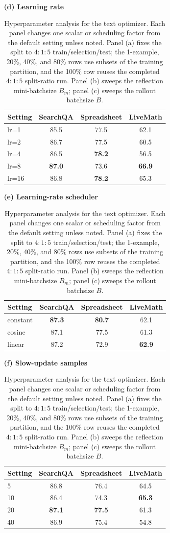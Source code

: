 \documentclass{llmxive}
\providecommand{\ablationbenchmarkheader}{\textbf{Setting} & \textbf{SearchQA} & \textbf{Spreadsheet} & \textbf{LiveMath} \\}
\begin{document}
\begin{table}[t]
{\begin{minipage}{1.12\textwidth}
\vspace{2pt}

\begin{minipage}[c]{0.33\textwidth}
\centering
\textbf{(d) Learning rate}\\[-1pt]
\begin{tabular}{@{}lccc@{}}
\toprule
\ablationbenchmarkheader
\midrule
lr=1 & 85.5 & 77.5 & 62.1 \\
lr=2 & 86.7 & 77.5 & 60.5 \\
lr=4 & 86.5 & \textbf{78.2} & 56.5 \\
lr=8 & \textbf{87.0} & 73.6 & \textbf{66.9} \\
lr=16 & 86.8 & \textbf{78.2} & 65.3 \\
\bottomrule
\end{tabular}
\end{minipage}
\hfill
\begin{minipage}[c]{0.33\textwidth}
\centering
\textbf{(e) Learning-rate scheduler}\\[-1pt]
\begin{tabular}{@{}lccc@{}}
\toprule
\ablationbenchmarkheader
\midrule
constant & \textbf{87.3} & \textbf{80.7} & 62.1 \\
cosine & 87.1 & 77.5 & 61.3 \\
linear & 87.2 & 72.9 & \textbf{62.9} \\
\bottomrule
\end{tabular}
\end{minipage}
\hfill
\begin{minipage}[c]{0.33\textwidth}
\centering
\textbf{(f) Slow-update samples}\\[-1pt]
\begin{tabular}{@{}lccc@{}}
\toprule
\ablationbenchmarkheader
\midrule
5 & 86.8 & 76.4 & 64.5 \\
10 & 86.4 & 74.3 & \textbf{65.3} \\
20 & \textbf{87.1} & \textbf{77.5} & 61.3 \\
40 & 86.9 & 75.4 & 54.8 \\
\bottomrule
\end{tabular}
\end{minipage}
\end{minipage}%
}
\caption{Hyperparameter analysis for the text optimizer. Each panel changes one scalar or scheduling factor from the default setting unless noted. Panel (a) fixes the split to $4{:}1{:}5$ train/selection/test; the 1-example, 20\%, 40\%, and 80\% rows use subsets of the training partition, and the 100\% row reuses the completed $4{:}1{:}5$ split-ratio run. Panel (b) sweeps the reflection mini-batchsize $B_m$; panel (c) sweeps the rollout batchsize $B$.}
\label{tab:ablation_sweeps}
\end{table}
\end{document}
